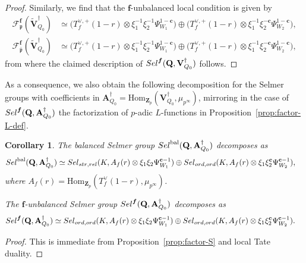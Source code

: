 \documentclass[10pt,letterpaper]{amsart}
\theoremstyle{plain}
\theoremstyle{definition}
\theoremstyle{definition}
\theoremstyle{plain}
\theoremstyle{plain}
\theoremstyle{plain}
\newtheorem{cor}[thm]{Corollary}
\theoremstyle{remark}
\numberwithin{equation}{section}
\newcommand{\cc}{\mathbf{c}}
\newcommand{\ch}{\xi}
\newcommand{\Sel}{Sel}
\newcommand{\pp}{\mathfrak{p}}
\newcommand{\ppbar}{\bar{\mathfrak{p}}}
\newcommand{\strrel}{{{\rm str},{\rm rel}}}
\newcommand{\ord}{{{\rm ord},{\rm ord}}}
\DeclareMathOperator{\bal}{\mathrm{bal}}
\newcommand{\Vsdag}{{\mathbf{V}_{Q_0}^\dagger}}
\newcommand{\unb}{{\boldsymbol{f}}}
\newcommand{\Q}{\mathbf{Q}}
\newcommand{\Z}{\mathbf{Z}}
\def\Sel{{\rm Sel}}
\begin{document}
\begin{proof}
Similarly, we find that the $\unb$-unbalanced local condition is given by
\begin{equation}
\begin{aligned}
\mathscr{F}^{\unb}_\pp(\widetilde{\mathbf{V}}_{Q_0}^\dagger)&\simeq\bigl(T_f^{\vee,+}(1-r)\otimes\ch_1^{-1}\ch_2^{-1}\Psi_{W_1}^{1-\cc}\bigr)\oplus\bigl(T_f^{\vee,+}(1-r)\otimes\ch_1^{-1}\ch_2^{-\cc}\Psi_{W_2}^{1-\cc}\bigr),\\
\mathscr{F}^{\unb}_{\ppbar}(\widetilde{\mathbf{V}}_{Q_0}^\dagger)&\simeq\bigl(T_f^{\vee,+}(1-r)\otimes\ch_1^{-1}\ch_2^{-1}\Psi_{W_1}^{1-\cc}\bigr)\oplus\bigl(T_f^{\vee,+}(1-r)\otimes\ch_1^{-1}\ch_2^{-\cc}\Psi_{W_2}^{1-\cc}\bigr),\nonumber
\end{aligned}
\end{equation}
from where the claimed description of $\Sel^\unb(\Q,\Vsdag)$ follows.
\end{proof}

As a consequence, we also obtain the following decomposition for the Selmer groups with coefficients in $\mathbf{A}_{Q_0}^\dagger={\mathrm{Hom}}_{\Z_p}(\Vsdag,\mu_{p^\infty})$, mirroring in the case of $\Sel^{\unb}(\Q,\mathbf{A}_{Q_0}^\dagger)$ the factorization of $p$-adic $L$-functions in Proposition~\ref{prop:factor-L-def}. 
 

\begin{cor}\label{cor:factor-S}
The balanced Selmer group $\Sel^{\bal}(\Q,\mathbf{A}_{Q_0}^\dagger)$ decomposes as
\begin{align*}
\Sel^{\bal}(\Q,\mathbf{A}_{Q_0}^\dagger)&\simeq\Sel_{\strrel}(K,A_f(r)\otimes\ch_1\ch_2\Psi_{W_1}^{\cc-1})\oplus\Sel_{\ord}(K,A_f(r)\otimes\ch_1\ch_2^\cc\Psi_{W_2}^{\cc-1}),
\end{align*}
where $A_f(r)={\mathrm{Hom}}_{\Z_p}(T_f^\vee(1-r),\mu_{p^\infty})$.

The $\unb$-unbalanced Selmer group $\Sel^{\unb}(\Q,\mathbf{A}_{Q_0}^\dagger)$ decomposes as
\begin{align*}
\Sel^{\unb}(\Q,\mathbf{A}_{Q_0}^\dagger)&\simeq
\Sel_{\ord}(K,A_f(r)\otimes\ch_1\ch_2\Psi_{W_1}^{\cc-1})\oplus\Sel_{\ord}(K,A_f(r)\otimes\ch_1\ch_2^\cc\Psi_{W_2}^{\cc-1}).
\end{align*}
\end{cor}

\begin{proof}
This is immediate from Proposition~\ref{prop:factor-S} and local Tate duality.
\end{proof}
\end{document}
